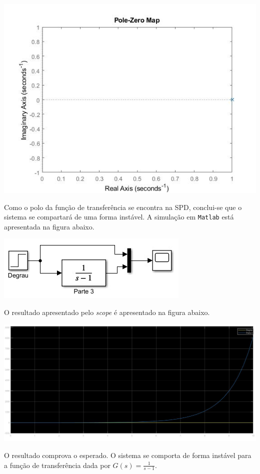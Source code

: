 \documentclass[
]{book}
\begin{document}
\includegraphics{Imagens/Lab2/tau3.jpg}

Como o polo da função de transferência se encontra na SPD, conclui-se que o sistema se compartará de uma forma instável. A simulação em \texttt{Matlab} está apresentada na figura abaixo.

\includegraphics{Imagens/Lab2/sim2.jpg}

O resultado apresentado pelo \emph{scope} é apresentado na figura abaixo.

\includegraphics{Imagens/Lab2/resultSim2.jpg}

O resultado comprova o esperado. O sistema se comporta de forma instável para a função de transferência dada por \(G(s) = \frac {1}{s-1}\).
\end{document}
